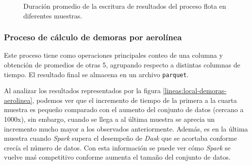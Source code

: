 \begin{figure}
\centering
{}
\caption{Duración promedio de la escritura de resultados del proceso flota en diferentes muestras.}
\label{lineas:local-flota-write}
\end{figure}

\subsubsection{Proceso de cálculo de demoras por aerolínea}

Este proceso tiene como operaciones principales conteo de una columna y obtención de promedios de otras 5, agrupando respecto a distintas columnas de tiempo. El resultado final se almacena en un archivo \texttt{parquet}.

Al analizar los resultados representados por la figura \ref{lineas:local-demoras-aerolinea}, podemos ver que el incremento de tiempo de la primera a la cuarta muestra es pequeño comparado con el aumento del conjunto de datos (cercano a 1000x), sin embargo, cuando se llega a al última muestra se aprecia un incremento mucho mayor a los observados anteriormente. Además, es en la última muestra cuando \textit{Spark} supera el desempeño de \textit{Dask} que se acortaba conforme crecía el número de datos. Con esta información se puede ver cómo \textit{Spark} se vuelve maś competitivo conforme aumenta el tamaño del conjunto de datos. 

